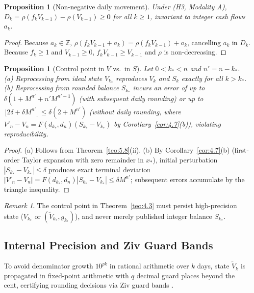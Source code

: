 \documentclass[11pt, a4paper]{article}
\theoremstyle{definition}
\theoremstyle{plain}
\newtheorem{proposicao}[definicao]{Proposition}
\theoremstyle{remark}
\newtheorem{observacao}[definicao]{Remark}
\begin{document}
\begin{proposicao}[Non-negative daily movement]\label{prop:5.10}
Under (H3, Modality A), $D_k = \rho(f_k V_{k-1}) - \rho(V_{k-1}) \ge 0$ for all $k \ge 1$, invariant to integer cash flows $a_k$.
\end{proposicao}
\begin{proof}
Because $a_k \in \mathbb{Z}$, $\rho(f_k V_{k-1} + a_k) = \rho(f_k V_{k-1}) + a_k$, cancelling $a_k$ in $D_k$. Because $f_k \ge 1$ and $V_{k-1} \ge 0$, $f_k V_{k-1} \ge V_{k-1}$ and $\rho$ is non-decreasing.
\end{proof}

\begin{proposicao}[Control point in $V$ vs.\ in $S$]\label{prop:5.11}
Let $0 < k_* < n$ and $n' = n - k_*$. (a) Reprocessing from ideal state $V_{k_*}$ reproduces $V_k$ and $S_k$ exactly for all $k > k_*$. (b) Reprocessing from rounded balance $S_{k_*}$ incurs an error of up to $\delta(1 + M^{n'} + n' M^{n'-1})$ (with subsequent daily rounding) or up to $\lfloor 2\delta + \delta M^{n'} \rfloor \le \delta(2 + M^{n'})$ (without daily rounding, where $V'_n - V_n = F(d_{k_*}, d_n)(S_{k_*} - V_{k_*})$ by Corollary~\ref{cor:4.7}(b)), violating reproducibility.
\end{proposicao}
\begin{proof}
(a) Follows from Theorem~\ref{teo:5.8}(ii). (b) By Corollary~\ref{cor:4.7}(b) (first-order Taylor expansion with zero remainder in $x_*$), initial perturbation $|S_{k_*} - V_{k_*}| \le \delta$ produces exact terminal deviation $|V'_n - V_n| = F(d_{k_*}, d_n)|S_{k_*} - V_{k_*}| \le \delta M^{n'}$; subsequent errors accumulate by the triangle inequality.
\end{proof}

\begin{observacao}\label{obs:5.12}
The control point in Theorem~\ref{teo:4.3} must persist high-precision state ($V_{k_*}$ or $(\tilde{V}_{k_*}, g_{k_*})$), and never merely published integer balance $S_{k_*}$.
\end{observacao}

\subsection{Internal Precision and Ziv Guard Bands}\label{sec:5.4}

To avoid denominator growth $10^{pk}$ in rational arithmetic over $k$ days, state $\tilde{V}_k$ is propagated in fixed-point arithmetic with $q$ decimal guard places beyond the cent, certifying rounding decisions via Ziv guard bands \cite{Ziv1991, Muller2018}.
\end{document}
